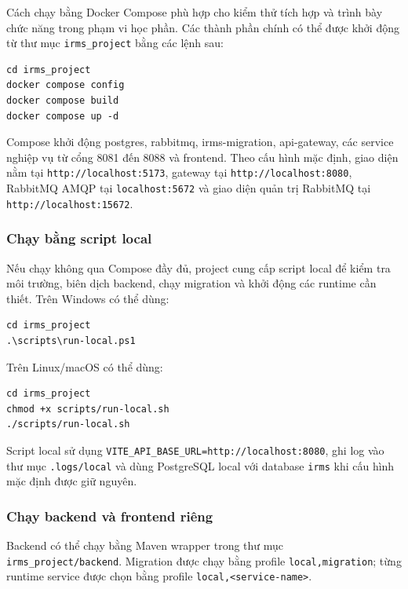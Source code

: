 Cách chạy bằng Docker Compose phù hợp cho kiểm thử tích hợp và trình bày chức năng trong phạm vi học phần. Các thành phần chính có thể được khởi động từ thư mục \texttt{irms\_project} bằng các lệnh sau:

\begin{verbatim}
cd irms_project
docker compose config
docker compose build
docker compose up -d
\end{verbatim}

Compose khởi động \textsf{postgres}, \textsf{rabbitmq}, \textsf{irms-migration}, \textsf{api-gateway}, các service nghiệp vụ từ cổng 8081 đến 8088 và \textsf{frontend}. Theo cấu hình mặc định, giao diện nằm tại \texttt{http://localhost:5173}, gateway tại \texttt{http://localhost:8080}, RabbitMQ AMQP tại \texttt{localhost:5672} và giao diện quản trị RabbitMQ tại \texttt{http://localhost:15672}.

\subsubsection*{Chạy bằng script local}

Nếu chạy không qua Compose đầy đủ, project cung cấp script local để kiểm tra môi trường, biên dịch backend, chạy migration và khởi động các runtime cần thiết. Trên Windows có thể dùng:

\begin{verbatim}
cd irms_project
.\scripts\run-local.ps1
\end{verbatim}

Trên Linux/macOS có thể dùng:

\begin{verbatim}
cd irms_project
chmod +x scripts/run-local.sh
./scripts/run-local.sh
\end{verbatim}

Script local sử dụng \texttt{VITE\_API\_BASE\_URL=http://localhost:8080}, ghi log vào thư mục \texttt{.logs/local} và dùng PostgreSQL local với database \texttt{irms} khi cấu hình mặc định được giữ nguyên.

\subsubsection*{Chạy backend và frontend riêng}

Backend có thể chạy bằng Maven wrapper trong thư mục \texttt{irms\_project/backend}. Migration được chạy bằng profile \texttt{local,migration}; từng runtime service được chọn bằng profile \texttt{local,<service-name>}.

